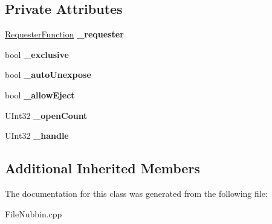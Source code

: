 \subsection*{Private Attributes}
\begin{DoxyCompactItemize}
\item 
\mbox{\label{class_nubbin_handle_a93fc943afef439f46765a76d29e5ad84}} 
\hyperlink{classbicycle_1_1function}{Requester\+Function} {\bfseries \+\_\+requester}
\item 
\mbox{\label{class_nubbin_handle_ace50d0ac556b64dab50e1985217bd8b9}} 
bool {\bfseries \+\_\+exclusive}
\item 
\mbox{\label{class_nubbin_handle_a7f87e2d27d3f46a6b821f853dd05021e}} 
bool {\bfseries \+\_\+auto\+Unexpose}
\item 
\mbox{\label{class_nubbin_handle_a35ccf0b8422a9306d681451583bb1fa5}} 
bool {\bfseries \+\_\+allow\+Eject}
\item 
\mbox{\label{class_nubbin_handle_a49a1b11d575dc9f1a0572760bb0ddec7}} 
U\+Int32 {\bfseries \+\_\+open\+Count}
\item 
\mbox{\label{class_nubbin_handle_ad8be45fe38e62fbe2b48720b7247488d}} 
U\+Int32 {\bfseries \+\_\+handle}
\end{DoxyCompactItemize}
\subsection*{Additional Inherited Members}


The documentation for this class was generated from the following file\+:\begin{DoxyCompactItemize}
\item 
File\+Nubbin.\+cpp\end{DoxyCompactItemize}
